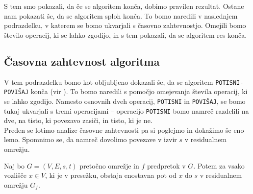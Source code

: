 \documentclass[mat1]{fmfdelo}
\begin{document}
S tem smo pokazali, da če se algoritem konča, dobimo pravilen rezultat. Ostane nam pokazati še, da se algoritem sploh konča. To bomo naredili v naslednjem podrazdelku, v katerem se bomo ukvarjali s časovno zahtevnostjo. Omejili bomo število operacij, ki se lahko zgodijo, in s tem pokazali, da se algoritem res konča.\\

\subsection{Časovna zahtevnost algoritma}

V tem podrazdelku bomo kot obljubljeno dokazali še, da se algoritem \texttt{POTISNI-POVIŠAJ} konča (vir \cite{clrs}). To bomo naredili s pomočjo omejevanja števila operacij, ki se lahko zgodijo. Namesto osnovnih dveh operacij, \texttt{POTISNI} in \texttt{POVIŠAJ}, se bomo tukaj ukvarjali s tremi operacijami -- operacijo \texttt{POTISNI} bomo namreč razdelili na dve, na tisto, ki povezavo zasiči, in tisto, ki je ne.\\

Preden se lotimo analize časovne zahtevnosti pa si poglejmo in dokažimo še eno lemo. Spomnimo se, da namreč dovolimo povezave v izvir $s$ v residualnem omrežju.\\

\begin{lema}\label{lem:enostavna_pot_s}
Naj bo $G=(V,E,s,t)$ pretočno omrežje in $f$ predpretok v $G$. Potem za vsako vozlišče $x\in V$, ki je v presežku, obstaja enostavna pot od $x$ do $s$ v residualnem omrežju $G_f$.
\end{lema}
\end{document}

